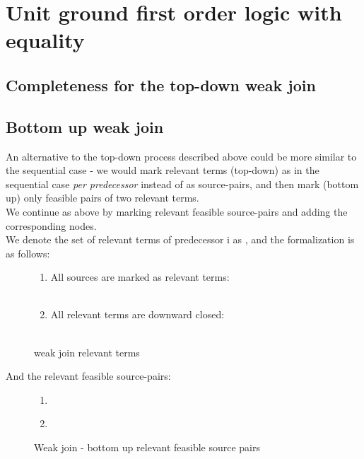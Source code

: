 \section{Unit ground first order logic with equality}
\subsection{Completeness for the top-down weak join}
\subsection{Bottom up weak join}
An alternative to the top-down process described above could be more similar to the sequential case - 
we would mark relevant terms (top-down) as in the sequential case \emph{per predecessor} instead of as source-pairs, 
and then mark (bottom up) only feasible pairs of two relevant terms.\\
We continue as above by marking relevant feasible source-pairs and adding the corresponding nodes.\\
We denote the set of relevant terms of predecessor i as , and the formalization is as follows:
\begin{figure}[H]
\begin{enumerate}
	\item All sources are marked as relevant terms:\\
		\\
	\item All relevant terms are downward closed:\\
		\\
\end{enumerate}
\caption{weak join relevant terms}
\label{wj_relevant_terms}
\end{figure}
And the relevant feasible source-pairs:
\begin{figure}[H]
\begin{enumerate}
	\item {}\\
	\item {}\\
\end{enumerate}
\caption{Weak join - bottom up relevant feasible source pairs}
\label{wj_alternative_relevant_feasible_source_pairs}
\end{figure}
